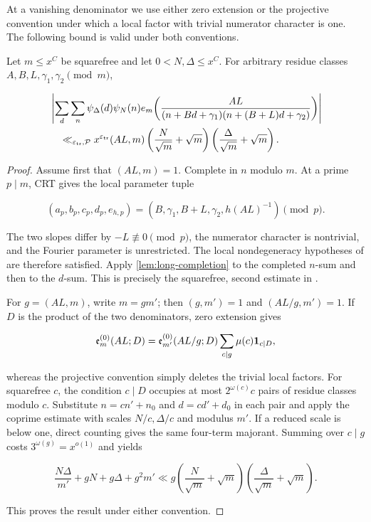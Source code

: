 At a vanishing denominator we use either zero extension or the projective
convention under which a local factor with trivial numerator character is
one.  The following bound is valid under both conventions.

\begin{lemma}
\label{lem:squarefree-trace}
Let $m\le x^C$ be squarefree and let $0<N,\Delta\le x^C$.  For arbitrary
residue classes $A,B,L,\gamma_1,\gamma_2\pmod m$,

\begin{align}
&\left|\sum_d\sum_n\psi_\Delta(d)\psi_N(n)
e_m\!\left(
\frac{AL}{(n+Bd+\gamma_1)(n+(B+L)d+\gamma_2)}
\right)\right|\notag\\
&\quad\ll_{\varepsilon_{\rm tr},\mathcal P}
x^{\varepsilon_{\rm tr}}(AL,m)
\left(\frac N{\sqrt m}+\sqrt m\right)
\left(\frac\Delta{\sqrt m}+\sqrt m\right).
\label{eq:squarefree-trace}
\end{align}
\end{lemma}

\begin{proof}
Assume first that $(AL,m)=1$.  Complete in $n$ modulo $m$.  At a prime
$p\mid m$, CRT gives the local parameter tuple

\[
 (a_p,b_p,c_p,d_p,e_{h,p})
 =\left(B,\gamma_1,B+L,\gamma_2,h(AL)^{-1}\right)\pmod p.
\]

The two slopes differ by $-L\not\equiv0\pmod p$, the numerator character
is nontrivial, and the Fourier parameter is unrestricted.  The local
nondegeneracy hypotheses of
\cite[Theorem~6.17]{PolymathEDZ2014} are therefore satisfied.  Apply
\cref{lem:long-completion} to the completed $n$-sum and then to the
$d$-sum.  This is precisely the squarefree, second estimate in
\cite[Proposition~8.4]{PolymathEDZ2014}.

For $g=(AL,m)$, write $m=gm'$; then $(g,m')=1$ and
$(AL/g,m')=1$.  If $D$ is the product of the two denominators, zero
extension gives

\[
 \mathfrak e_m^{(0)}(AL;D)
 =\mathfrak e_{m'}^{(0)}(AL/g;D)
 \sum_{c\mid g}\mu(c)\mathbf 1_{c\mid D},
\]

whereas the projective convention simply deletes the trivial local factors.
For squarefree $c$, the condition $c\mid D$ occupies at most
$2^{\omega(c)}c$ pairs of residue classes modulo $c$.  Substitute
$n=cn'+n_0$ and $d=cd'+d_0$ in each pair and apply the coprime estimate
with scales $N/c,\Delta/c$ and modulus $m'$.  If a reduced scale is below
one, direct counting gives the same four-term majorant.  Summing over
$c\mid g$ costs $3^{\omega(g)}=x^{o(1)}$ and yields

\[
 \frac{N\Delta}{m'}+gN+g\Delta+g^2m'
 \ll g\left(\frac N{\sqrt m}+\sqrt m\right)
 \left(\frac\Delta{\sqrt m}+\sqrt m\right).
\]

This proves the result under either convention.
\end{proof}

